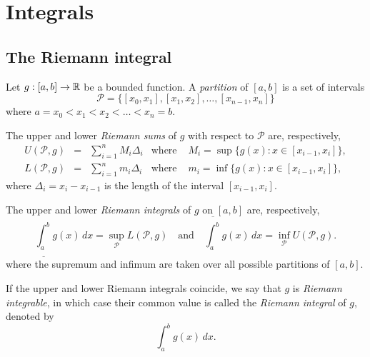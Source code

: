 \section{Integrals}

\subsection{The Riemann integral}
Let $g:[a,b]\to\mathbb{R}$ be a bounded function. A \emph{partition} of $[a,b]$ is a set of intervals
\[
\mathcal{P}=\{ [x_0,x_1], [x_1,x_2], \ldots, [x_{n-1},x_n] \}
\]
where $a = x_0 < x_1 < x_2 < \ldots < x_n = b$.

\bigskip
The upper and lower \emph{Riemann sums} of $g$ with respect to $\mathcal{P}$ are, respectively,
\[
\begin{array}{lclcl}
U(\mathcal{P},g)	& = & \displaystyle\sum_{i=1}^n M_i\Delta_i 	& \text{where } & M_i = \sup\{g(x): x\in [x_{i-1}, x_i]\}, \\
L(\mathcal{P},g) 	& = & \displaystyle\sum_{i=1}^n m_i\Delta_i	& \text{where } & m_i = \inf\{g(x): x\in [x_{i-1}, x_i]\},
\end{array}
\]
where $\Delta_i = x_i- x_{i-1}$ is the length of the interval $[x_{i-1},x_i]$.

\bigskip

The upper and lower \emph{Riemann integrals} of $g$ on $[a,b]$ are, respectively,
\[
\underline{\int_a^b} g(x)\,dx = \sup_{\mathcal{P}} L(\mathcal{P},g)
\quad\text{and}\quad
\overline{\int_a^b} g(x)\,dx  = \inf_{\mathcal{P}} U(\mathcal{P},g).
\]
where the supremum and infimum are taken over all possible partitions of $[a,b]$.

\bigskip
If the upper and lower Riemann integrals coincide, we say that $g$ is \emph{Riemann integrable}, in which case their common value is called the \emph{Riemann integral} of $g$, denoted by
\[
\displaystyle\int_a^b g(x)\,dx.
\]

